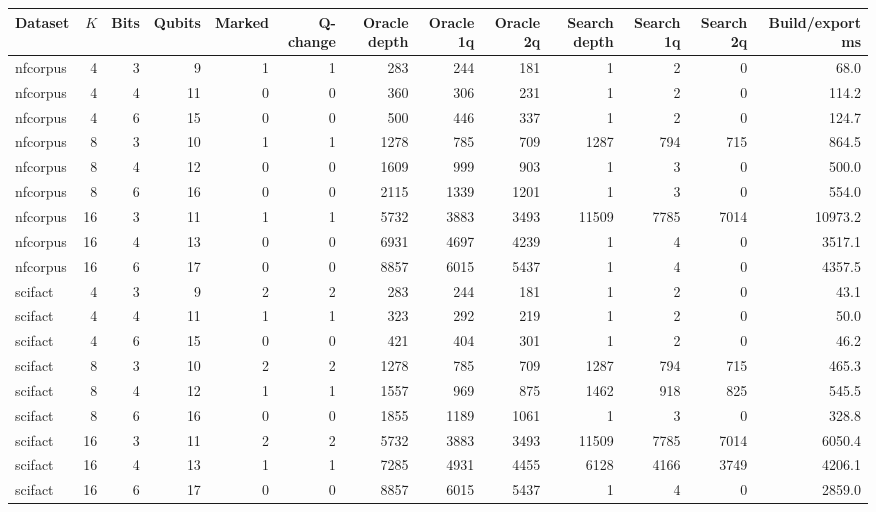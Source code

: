 \begin{tabular}{lrrrrrrrrrrrr}
\toprule
Dataset & $K$ & Bits & Qubits & Marked & Q-change & Oracle depth & Oracle 1q & Oracle 2q & Search depth & Search 1q & Search 2q & Build/export ms\\
\midrule
nfcorpus & 4 & 3 & 9 & 1 & 1 & 283 & 244 & 181 & 1 & 2 & 0 & 68.0\\
nfcorpus & 4 & 4 & 11 & 0 & 0 & 360 & 306 & 231 & 1 & 2 & 0 & 114.2\\
nfcorpus & 4 & 6 & 15 & 0 & 0 & 500 & 446 & 337 & 1 & 2 & 0 & 124.7\\
nfcorpus & 8 & 3 & 10 & 1 & 1 & 1278 & 785 & 709 & 1287 & 794 & 715 & 864.5\\
nfcorpus & 8 & 4 & 12 & 0 & 0 & 1609 & 999 & 903 & 1 & 3 & 0 & 500.0\\
nfcorpus & 8 & 6 & 16 & 0 & 0 & 2115 & 1339 & 1201 & 1 & 3 & 0 & 554.0\\
nfcorpus & 16 & 3 & 11 & 1 & 1 & 5732 & 3883 & 3493 & 11509 & 7785 & 7014 & 10973.2\\
nfcorpus & 16 & 4 & 13 & 0 & 0 & 6931 & 4697 & 4239 & 1 & 4 & 0 & 3517.1\\
nfcorpus & 16 & 6 & 17 & 0 & 0 & 8857 & 6015 & 5437 & 1 & 4 & 0 & 4357.5\\
scifact & 4 & 3 & 9 & 2 & 2 & 283 & 244 & 181 & 1 & 2 & 0 & 43.1\\
scifact & 4 & 4 & 11 & 1 & 1 & 323 & 292 & 219 & 1 & 2 & 0 & 50.0\\
scifact & 4 & 6 & 15 & 0 & 0 & 421 & 404 & 301 & 1 & 2 & 0 & 46.2\\
scifact & 8 & 3 & 10 & 2 & 2 & 1278 & 785 & 709 & 1287 & 794 & 715 & 465.3\\
scifact & 8 & 4 & 12 & 1 & 1 & 1557 & 969 & 875 & 1462 & 918 & 825 & 545.5\\
scifact & 8 & 6 & 16 & 0 & 0 & 1855 & 1189 & 1061 & 1 & 3 & 0 & 328.8\\
scifact & 16 & 3 & 11 & 2 & 2 & 5732 & 3883 & 3493 & 11509 & 7785 & 7014 & 6050.4\\
scifact & 16 & 4 & 13 & 1 & 1 & 7285 & 4931 & 4455 & 6128 & 4166 & 3749 & 4206.1\\
scifact & 16 & 6 & 17 & 0 & 0 & 8857 & 6015 & 5437 & 1 & 4 & 0 & 2859.0\\
\bottomrule
\end{tabular}
